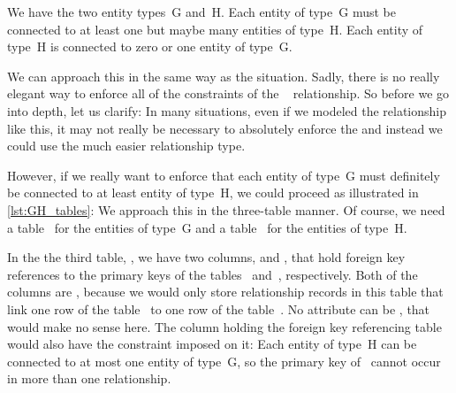 %
%
\label{sec:rm:gh}%
%
%
%
%
%
%
%
%
%
%
%
We have the two entity types~G and~H.
Each entity of type~G must be connected to at least one but maybe many entities of type~H.
Each entity of type~H is connected to zero or one entity of type~G.

We can approach this in the same way as the  situation.
Sadly, there is no really elegant way to enforce all of the constraints of the ~ relationship.
So before we go into depth, let us clarify:
In many situations, even if we modeled the relationship like this, it may not really be necessary to absolutely enforce the  and instead we could use the much easier  relationship type.

However, if we really want to enforce that each entity of type~G must definitely be connected to at least entity of type~H, we could proceed as illustrated in \cref{lst:GH_tables}:
We approach this in the three-table manner.
Of course, we need a table~ for the entities of type~G and a table~ for the entities of type~H.

In the the third table, , we have two columns,  and , that hold foreign key references to the primary keys of the tables~ and~, respectively.
Both of the columns are , because we would only store relationship records in this table that link one row of the table~ to one row of the table~.
No attribute can be , that would make no sense here.
The column holding the foreign key referencing table~ would also have the  constraint imposed on it:
Each entity of type~H can be connected to at most one entity of type~G, so the primary key of~ cannot occur in more than one relationship.

